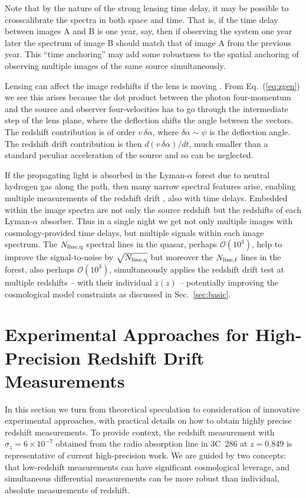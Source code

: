\documentclass[preprint2, 10pt]{aastex}
\begin{document}
Note that by the nature of the strong lensing time delay, it may be possible 
to crosscalibrate the spectra in both space and time.  That is, if the time 
delay between images A and B is one year, say, then if observing the system 
one year later the spectrum of image B should match that of image A from 
the previous year.  This ``time anchoring'' may add some robustness to 
the spatial anchoring of observing multiple images of the same source 
simultaneously. 

Lensing can affect the image redshifts if the lens is moving 
\citep{mitrofanov,birkgull}.  From 
Eq.~(\ref{eq:zgen}) we see this arises because the dot product between 
the photon four-momentum and the source and observer four-velocities 
has to go through the intermediate step of the lens plane, where the 
deflection shifts the angle between the vectors.  The redshift contribution 
is of order $v\,\delta\alpha$, where $\delta\alpha\sim\psi$ is the 
deflection angle.  The redshift drift contribution is then 
$d(v\,\delta\alpha)/dt$, much smaller than a standard peculiar 
acceleration of the source and so can be neglected. 

If the propagating light is 
absorbed in the Lyman-$\alpha$ forest due to neutral hydrogen gas along 
the path, then many narrow spectral features arise, enabling multiple 
measurements of the redshift drift 
\citep{1998ApJ...499L.111L,2008MNRAS.386.1192L}, 
also with time delays. 
Embedded within the image spectra are not only the source redshift but 
the redshifts of each Lyman-$\alpha$ absorber.  Thus in a single night we get 
not only multiple images with cosmology-provided time delays, but multiple 
signals within each image spectrum.  The $N_{\rm line,q}$ spectral lines 
in the quasar, perhaps ${\mathcal O}(10^3)$, help to improve the 
signal-to-noise by $\sqrt{N_{\rm line,q}}$ but moreover the 
$N_{\rm line,f}$ lines in the forest, also perhaps ${\mathcal O}(10^3)$, 
simultaneously applies the redshift drift test at multiple redshifts 
-- with their individual $\dot z(z)$ -- potentially improving the cosmological 
model constraints as discussed in Sec.~\ref{sec:basic}. 

\section{Experimental Approaches for High-Precision Redshift Drift Measurements} \label{sec:tech} 

In this section we turn from theoretical speculation to consideration of 
innovative experimental approaches, with practical details on how to 
obtain highly precise redshift measurements. 
To provide context, the redshift measurement with 
$\sigma_z=6\times 10^{-7}$ obtained
from the radio absorption line in 3C~286 at $z=0.849$
\citep{1978ApJ...219....1D} is representative of current high-precision 
work. 
We are guided by two concepts: 
that low-redshift measurements can have significant cosmological leverage, 
and simultaneous differential measurements can be more robust than 
individual, absolute measurements of redshift.  
\end{document}
